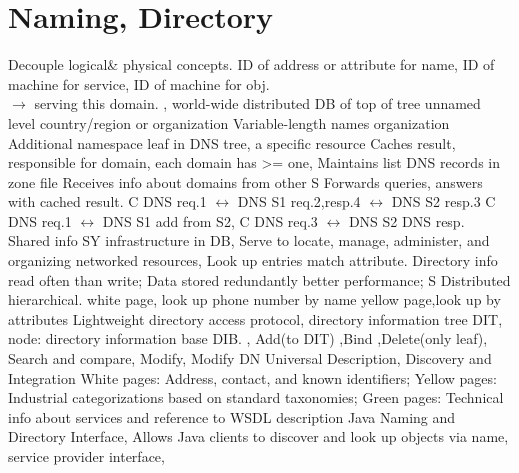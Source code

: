 \section{Naming, Directory}
Decouple logical\& physical concepts.
ID of address or attribute for name,
ID of machine for service,
ID of machine for obj.
\\
$\rightarrow$
 serving this domain.
,
world-wide distributed DB of 
\textbar
{}
top of tree unnamed level
country/region or organization
Variable-length names organization
Additional namespace
leaf in DNS tree, a specific resource
\textbar
{}
Caches result,
responsible for domain, each domain has >= one,
Maintains list DNS records in zone file
Receives info about domains from other S
Forwards queries, answers with cached result.
\textbar
{}
C DNS req.1
$\leftrightarrow$
DNS S1 req.2,resp.4
$\leftrightarrow$
DNS S2 resp.3
C DNS req.1
$\leftrightarrow$
DNS S1 add from S2,
C DNS req.3
$\leftrightarrow$
DNS S2 DNS resp.
\\
Shared info SY infrastructure in DB,
Serve to locate, manage, administer, and organizing networked resources,
Look up entries match attribute.
Directory info read often than write;
Data stored redundantly better performance;
S Distributed hierarchical.
white page, look up phone number by name
yellow page,look up by attributes
\textbar \textbar
{}
Lightweight directory access protocol,
directory information tree DIT,
node: directory information base DIB.
,
Add(to DIT)
,Bind
,Delete(only leaf),
Search and compare,
Modify,
Modify DN
Universal Description, Discovery and Integration
White pages:
Address, contact, and known identifiers;
Yellow pages:
Industrial categorizations based on standard taxonomies;
Green pages:
Technical info about services and reference to WSDL description
Java Naming and Directory Interface,
Allows Java clients to discover and look up objects via name,
service provider interface,
